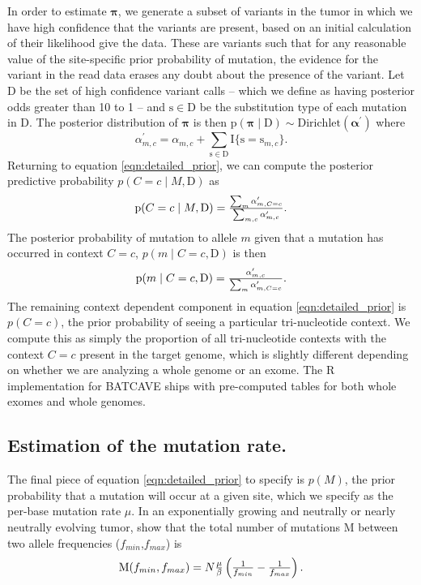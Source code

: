 \documentclass[a4,center,fleqn]{NAR}
\newcommand{\batcave}{BATCAVE }
\begin{document}
In order to estimate $\boldsymbol{\pi}$, we generate a subset of variants in the tumor in which we have high confidence that the variants are present, based on an initial calculation of their likelihood give the data.
These are variants such that for any reasonable value of the site-specific prior probability of mutation, the evidence for the variant in the read data erases any doubt about the presence of the variant. 
Let $\mathrm{D}$ be the set of high confidence variant calls -- which we define as having posterior odds greater than 10 to 1 -- and $\mathrm{s} \in \mathrm{D}$ be the substitution type of each mutation in $\mathrm{D}$.
The posterior distribution of $\boldsymbol{\pi}$ is then $\mathrm{p}(\boldsymbol{\pi} \mid \mathrm{D}) \sim \textrm{Dirichlet}(\boldsymbol{\alpha^{\prime}})$ where
  $$
    \alpha^{\prime}_{m,c} = \alpha_{m,c} + \sum\limits_{\mathrm{s} \in \mathrm{D}} \mathrm{I}\{\mathrm{s} = \mathrm{s}_{m,c}\}.
  $$
Returning to equation \ref{eqn:detailed_prior}, we can compute the posterior predictive probability $p(C = c \mid M,\mathrm{D})$ as
\begin{equation}
  \label{eqn:post_pred}
  $$
  \mathrm{p}(C = c \mid M,\mathrm{D}) = \frac{\sum_{m}\alpha^{\prime}_{m,C = c}}{\sum_{m,c}\alpha^{\prime}_{m,c}}.
  $$
\end{equation}
The posterior probability of mutation to allele $m$ given that a mutation has occurred in context $C = c$, $p(m  \mid C = c,\mathrm{D})$ is then
\begin{equation}
  \label{eqn:to_allele}
  $$
   \mathrm{p}(m \mid C = c,\mathrm{D}) = \frac{\alpha^{\prime}_{m,c}}{\sum_{m} \alpha^{\prime}_{m,C = c}}.
  $$
\end{equation}
The remaining context dependent component in equation \ref{eqn:detailed_prior} is $p(C = c)$, the prior probability of seeing a particular tri-nucleotide context.
We compute this as simply the proportion of all tri-nucleotide contexts with the context $C = c$ present in the target genome, which is slightly different depending on whether we are analyzing a whole genome or an exome.
The R implementation for \batcave ships with pre-computed tables for both whole exomes and whole genomes.

\subsection{Estimation of the mutation rate.}
The final piece of equation \ref{eqn:detailed_prior} to specify is $p(M)$, the prior probability that a mutation will occur at a given site, which we specify as the per-base mutation rate $\mu$.
In an exponentially growing and neutrally or nearly neutrally evolving tumor, \citet{Williams2018} show that the total number of mutations $\mathrm{M}$ between two allele frequencies ($f_{min}$,$f_{max}$) is
\begin{equation}
  \label{eqn:mut_rate}
$$
  \mathrm{M}(f_{min},f_{max}) = N\frac{\mu}{\beta}\left(\frac{1}{f_{min}} - \frac{1}{f_{max}}\right).
$$
\end{equation}
\end{document}
